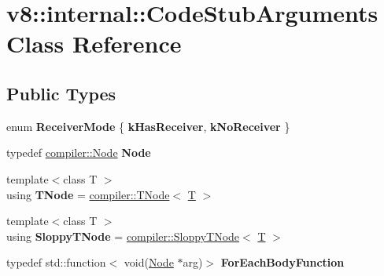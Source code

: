 \hypertarget{classv8_1_1internal_1_1CodeStubArguments}{}\section{v8\+:\+:internal\+:\+:Code\+Stub\+Arguments Class Reference}
\label{classv8_1_1internal_1_1CodeStubArguments}
\subsection*{Public Types}
\begin{DoxyCompactItemize}
\item 
\mbox{\label{classv8_1_1internal_1_1CodeStubArguments_ae6182ca99f50e847eb0fb5054f516dee}} 
enum {\bfseries Receiver\+Mode} \{ {\bfseries k\+Has\+Receiver}, 
{\bfseries k\+No\+Receiver}
 \}
\item 
\mbox{\label{classv8_1_1internal_1_1CodeStubArguments_a8559465b9b93249043457a5c3fb2dcbf}} 
typedef \mbox{\hyperlink{classv8_1_1internal_1_1compiler_1_1Node}{compiler\+::\+Node}} {\bfseries Node}
\item 
\mbox{\label{classv8_1_1internal_1_1CodeStubArguments_a4a51c49389691fa523d729b2dd4f1b58}} 
{\footnotesize template$<$class T $>$ }\\using {\bfseries T\+Node} = \mbox{\hyperlink{classv8_1_1internal_1_1compiler_1_1TNode}{compiler\+::\+T\+Node}}$<$ \mbox{\hyperlink{classv8_1_1internal_1_1torque_1_1T}{T}} $>$
\item 
\mbox{\label{classv8_1_1internal_1_1CodeStubArguments_a532c29eb47305751bfa81a99234b2d1c}} 
{\footnotesize template$<$class T $>$ }\\using {\bfseries Sloppy\+T\+Node} = \mbox{\hyperlink{classv8_1_1internal_1_1compiler_1_1SloppyTNode}{compiler\+::\+Sloppy\+T\+Node}}$<$ \mbox{\hyperlink{classv8_1_1internal_1_1torque_1_1T}{T}} $>$
\item 
\mbox{\label{classv8_1_1internal_1_1CodeStubArguments_a8c8832ce275b604f18d664852f16f1dd}} 
typedef std\+::function$<$ void(\mbox{\hyperlink{classv8_1_1internal_1_1compiler_1_1Node}{Node}} $\ast$arg)$>$ {\bfseries For\+Each\+Body\+Function}
\end{DoxyCompactItemize}
